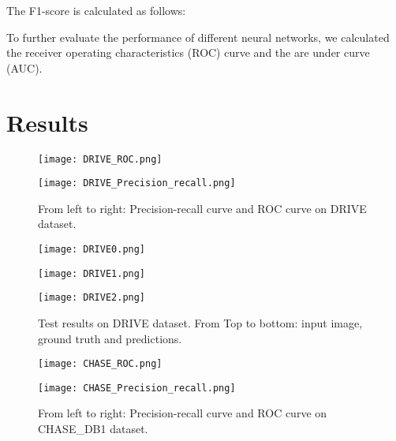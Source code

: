\documentclass{article}
\begin{document}
The F1-score is calculated as follows:



To further evaluate the performance of different neural networks, we calculated the receiver operating characteristics (ROC) curve and the are under curve (AUC). 
\section{Results}

\begin{figure}[!htb]
    \centering
    \begin{minipage}{.25\textwidth}
        \centering
        \texttt{[image: DRIVE\_ROC.png]}
    \end{minipage}\begin{minipage}{0.25\textwidth}
        \centering
        \texttt{[image: DRIVE\_Precision\_recall.png]}
    \end{minipage}
    \caption{
    \footnotesize{From left to right: Precision-recall curve and ROC curve on DRIVE dataset.}
    }
    \label{DRIVEROC}
\end{figure} 

\begin{figure}[!htb]
    \centering
    \begin{minipage}{0.14\textwidth}
        \centering
        \texttt{[image: DRIVE0.png]}
    \end{minipage}\begin{minipage}{0.14\textwidth}
        \centering
        \texttt{[image: DRIVE1.png]}
    \end{minipage}\begin{minipage}{0.14\textwidth}
        \centering
        \texttt{[image: DRIVE2.png]}
    \end{minipage}\caption{
    \footnotesize{Test results on DRIVE dataset. From Top to bottom: input image, ground truth and predictions.}
    }
    \label{DRIVEImage}
\end{figure} 


\begin{figure}[!htb]
    \centering
    \begin{minipage}{.25\textwidth}
        \centering
        \texttt{[image: CHASE\_ROC.png]}
    \end{minipage}\begin{minipage}{0.25\textwidth}
        \centering
        \texttt{[image: CHASE\_Precision\_recall.png]}
    \end{minipage}
    \caption{
    \footnotesize{From left to right: Precision-recall curve and ROC curve on CHASE\_DB1 dataset.}
    }
    \label{CHASEROC}
\end{figure} 
\end{document}
